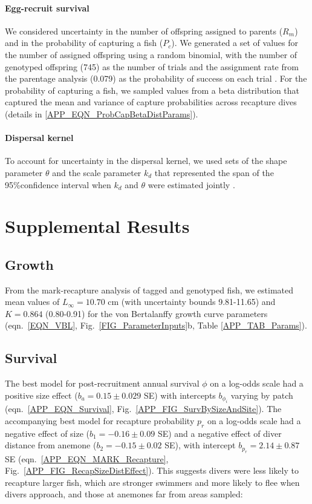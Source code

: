 \documentclass[12pt, oneside]{article}   	%
\begin{document}
\paragraph{Egg-recruit survival}

We considered uncertainty in the number of offspring assigned to parents ($R_m$) and in the probability of capturing a fish ($P_c$). We generated a set of values for the number of assigned offspring using a random binomial, with the number of genotyped offspring (745) as the number of trials and the assignment rate from the parentage analysis (0.079) as the probability of success on each trial \citep{catalanoInPrepconnectivity}. For the probability of capturing a fish, we sampled values from a beta distribution that captured the mean and variance of capture probabilities across recapture dives (details in \ref{APP_EQN_ProbCapBetaDistParams}).

\paragraph{Dispersal kernel}

To account for uncertainty in the dispersal kernel, we used sets of the shape parameter $\theta$ and the scale parameter $k_d$ that represented the span of the 95\%confidence interval when $k_d$ and $\theta$ were estimated jointly \citep[Table \ref{APP_TAB_Params},][]{catalanoInPrepconnectivity}.

\newpage{}

\section{Supplemental Results}

\subsection{Growth}

From the mark-recapture analysis of tagged and genotyped fish, we estimated mean values of $L_\infty = 10.70$ cm (with uncertainty bounds 9.81-11.65) and $K = 0.864$ (0.80-0.91) for the von Bertalanffy growth curve parameters (eqn.\ \ref{EQN_VBL}, Fig.\ \ref{FIG_ParameterInputs}b, Table \ref{APP_TAB_Params}). 

\subsection{Survival}

The best model for post-recruitment annual survival $\phi$ on a log-odds scale had a positive size effect ($b_a = 0.15 \pm 0.029$ SE) with intercepts $b_{\phi_i}$ varying by patch (eqn.\ \ref{APP_EQN_Survival}, Fig.\ \ref{APP_FIG_SurvBySizeAndSite}). The accompanying best model for recapture probability $p_r$ on a log-odds scale had a negative effect of size ($b_1 = -0.16 \pm 0.09$ SE) and a negative effect of diver distance from anemone ($b_2 = -0.15 \pm 0.02$ SE), with intercept $b_{p_r} = 2.14 \pm 0.87$ SE (eqn.\ \ref{APP_EQN_MARK_Recapture}, Fig.\ \ref{APP_FIG_RecapSizeDistEffect}). This suggests divers were less likely to recapture larger fish, which are stronger swimmers and more likely to flee when divers approach, and those at anemones far from areas sampled:
\end{document}
